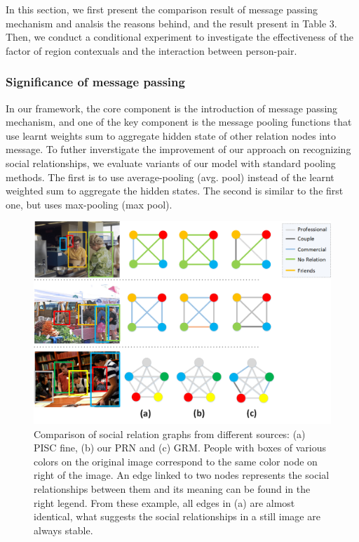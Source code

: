 \documentclass{article}
\begin{document}
In this section, we first present the comparison result  of message passing mechanism and analsis the reasons behind, and the result present in Table 3.
Then, we conduct a conditional experiment to investigate the effectiveness of 
the factor of region contexuals and the interaction between person-pair.

\subsubsection{Significance of message passing}

In our framework, the core component is the introduction of message passing mechanism, and one of the key component is the message pooling functions that use learnt weights sum to aggregate hidden state of other relation nodes into message. To futher inverstigate the improvement of our approach on recognizing social relationships, we evaluate variants of our model
with standard pooling methods. The first is to use average-pooling (avg. pool) instead of the learnt weighted sum to
aggregate the hidden states. The second is similar to the first
one, but uses max-pooling (max pool).

\begin{figure}[ht]
  \centering
  \includegraphics[width=0.9\linewidth]{pic/case_study_pisc_fine_union.png}
  \caption{Comparison of social relation graphs from different sources: (a) PISC fine, (b) our PRN and (c) GRM. People with boxes of various colors on the original image correspond to the same color node on right of the image. An edge linked to two nodes represents the social relationships between them and its meaning can be found in the right legend. From these example, all edges in (a) are almost identical, what suggests the social relationships in a still image are always stable.}
  \label{fig:case_study}
\end{figure}
\end{document}
